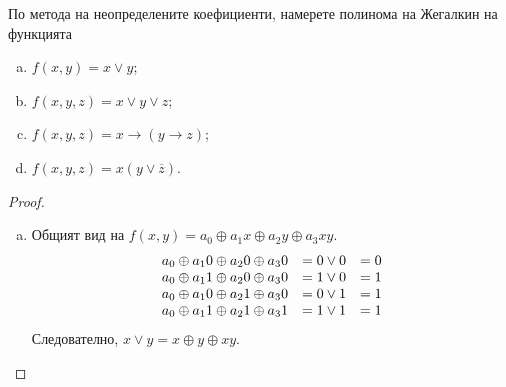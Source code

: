 \begin{problem}
  По метода на неопределените коефициенти, намерете полинома на Жегалкин на функцията 
  \begin{enumerate}[a)]
  \item
    $f(x,y) = x\vee y$;
  \item
    $f(x,y,z) = x\vee y \vee z$;
  \item
    $f(x,y,z) = x\rightarrow (y \rightarrow z)$;
  \item
    $f(x,y,z) = x(y\vee\overline{z})$.
  \end{enumerate}
\end{problem}
\begin{proof}
  \begin{enumerate}[a)]
  \item
    Общият вид на $f(x,y) = a_0\oplus a_1 x \oplus a_2 y \oplus a_3 xy $.
    \[
    \begin{array}{c c c}
      a_0\oplus a_1 0 \oplus a_2 0 \oplus a_3 0 & = 0 \vee 0  &  = 0\\
      a_0\oplus a_1 1 \oplus a_2 0 \oplus a_3 0 & = 1 \vee 0  &  = 1\\
      a_0\oplus a_1 0 \oplus a_2 1 \oplus a_3 0 & = 0 \vee 1  &  = 1\\
      a_0\oplus a_1 1 \oplus a_2 1 \oplus a_3 1 & = 1 \vee 1  &  = 1\\
    \end{array}
    \]
    Следователно, $x\vee y = x\oplus y\oplus xy$.
  \end{enumerate}
\end{proof}

